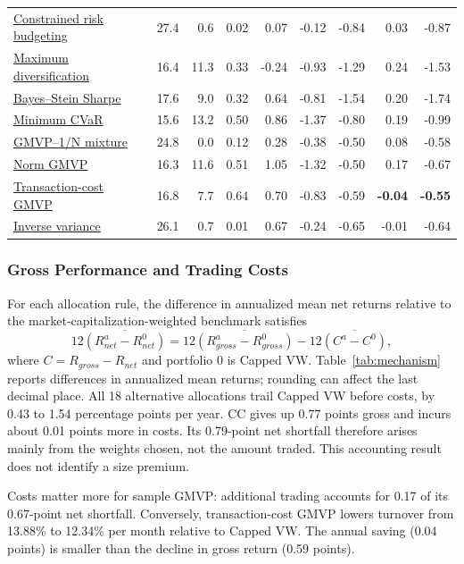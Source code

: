 \documentclass[letterpaper,journal]{IEEEtran}
\begin{document}
\begin{table}[!tp]
\begin{tabular}{lrrrrrrrr}
\hyperref[alloc:erc]{Constrained risk budgeting} & 27.4 & 0.6 & 0.02 & 0.07 & -0.12 & -0.84 & 0.03 & -0.87 \\
\hyperref[alloc:mdp]{Maximum diversification} & 16.4 & 11.3 & 0.33 & -0.24 & -0.93 & -1.29 & 0.24 & -1.53 \\
\hyperref[alloc:max_sharpe_bs]{Bayes--Stein Sharpe} & 17.6 & 9.0 & 0.32 & 0.64 & -0.81 & -1.54 & 0.20 & -1.74 \\
\hyperref[alloc:min_cvar]{Minimum CVaR} & 15.6 & 13.2 & 0.50 & 0.86 & -1.37 & -0.80 & 0.19 & -0.99 \\
\hyperref[alloc:mix_1n]{GMVP--1/N mixture} & 24.8 & 0.0 & 0.12 & 0.28 & -0.38 & -0.50 & 0.08 & -0.58 \\
\hyperref[alloc:norm_gmvp]{Norm GMVP} & 16.3 & 11.6 & 0.51 & 1.05 & -1.32 & -0.50 & 0.17 & -0.67 \\
\hyperref[alloc:tc_gmvp]{Transaction-cost GMVP} & 16.8 & 7.7 & 0.64 & 0.70 & -0.83 & -0.59 & \textbf{-0.04} & \textbf{-0.55} \\
\hyperref[alloc:vol_timing]{Inverse variance} & 26.1 & 0.7 & 0.01 & 0.67 & -0.24 & -0.65 & -0.01 & -0.64 \\
\bottomrule\end{tabular}\end{table}

\subsubsection{Gross Performance and Trading Costs}
For each allocation rule, the difference in annualized mean net returns relative to the market-capitalization-weighted benchmark satisfies
\begin{equation}
 12\overline{(R^a_{net}-R^0_{net})}
 =12\overline{(R^a_{gross}-R^0_{gross})}
 -12\overline{(C^a-C^0)},
\end{equation}
where $C=R_{gross}-R_{net}$ and portfolio 0 is Capped VW. Table~\ref{tab:mechanism} reports differences in annualized mean returns; rounding can affect the last decimal place. All 18 alternative allocations trail Capped VW before costs, by 0.43 to 1.54 percentage points per year. CC gives up 0.77 points gross and incurs about 0.01 points more in costs. Its 0.79-point net shortfall therefore arises mainly from the weights chosen, not the amount traded. This accounting result does not identify a size premium.

Costs matter more for sample GMVP: additional trading accounts for 0.17 of its 0.67-point net shortfall. Conversely, transaction-cost GMVP lowers turnover from 13.88\% to 12.34\% per month relative to Capped VW. The annual saving (0.04 points) is smaller than the decline in gross return (0.59 points).
\end{document}
